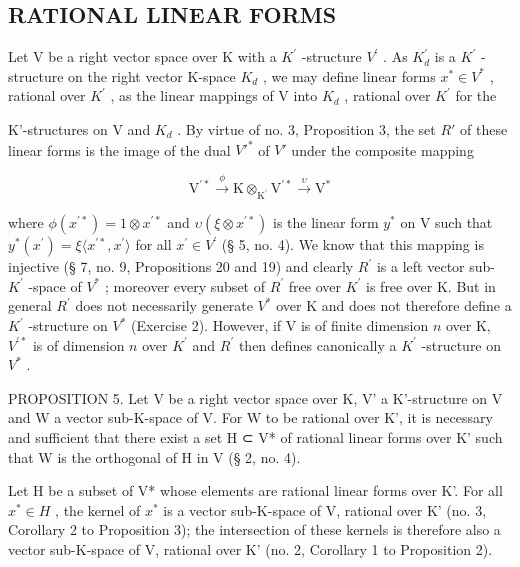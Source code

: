 \subsection{RATIONAL LINEAR FORMS}

Let V be a right vector space over K with a \(K^{\prime}\) -structure \(V^{\prime}\) . As \(K_{d}^{\prime}\) is a \(K^{\prime}\) -structure on the right vector K-space \(K_{d}\) , we may define linear forms \(x^{*} \in V^{*}\) , rational over \(K^{\prime}\) , as the linear mappings of V into \(K_{d}\) , rational over \(K^{\prime}\) for the

K'-structures on V and \(K_{d}\) . By virtue of no. 3, Proposition 3, the set \(R'\) of these linear forms is the image of the dual \(V'^*\) of \(V'\) under the composite mapping

\[
\mathrm{V} ^ {\prime *} \xrightarrow {\phi} \mathrm{K} \otimes_ {\mathrm{K} ^ {\prime}} \mathrm{V} ^ {\prime *} \xrightarrow {\upsilon} \mathrm{V} ^ {*}\tag{1}
\]

where \(\phi(x^{\prime*}) = 1 \otimes x^{\prime*}\) and \(\upsilon(\xi \otimes x^{\prime*})\) is the linear form \(y^{*}\) on V such that \(y^{*}(x^{\prime}) = \xi\langle x^{\prime*}, x^{\prime} \rangle\) for all \(x^{\prime} \in V^{\prime}\) (§ 5, no. 4). We know that this mapping is injective (§ 7, no. 9, Propositions 20 and 19) and clearly \(R^{\prime}\) is a left vector sub- \(K^{\prime}\) -space of \(V^{*}\) ; moreover every subset of \(R^{\prime}\) free over \(K^{\prime}\) is free over K. But in general \(R^{\prime}\) does not necessarily generate \(V^{*}\) over K and does not therefore define a \(K^{\prime}\) -structure on \(V^{*}\) (Exercise 2). However, if V is of finite dimension \(n\) over K, \(V^{\prime*}\) is of dimension \(n\) over \(K^{\prime}\) and \(R^{\prime}\) then defines canonically a \(K^{\prime}\) -structure on \(V^{*}\) .

PROPOSITION 5. Let V be a right vector space over K, V' a K'-structure on V and W a vector sub-K-space of V. For W to be rational over K', it is necessary and sufficient that there exist a set H ⊂ V* of rational linear forms over K' such that W is the orthogonal of H in V (§ 2, no. 4).

Let H be a subset of V* whose elements are rational linear forms over K'. For all \(x^{*} \in H\) , the kernel of \(x^{*}\) is a vector sub-K-space of V, rational over K' (no. 3, Corollary 2 to Proposition 3); the intersection of these kernels is therefore also a vector sub-K-space of V, rational over K' (no. 2, Corollary 1 to Proposition 2).

